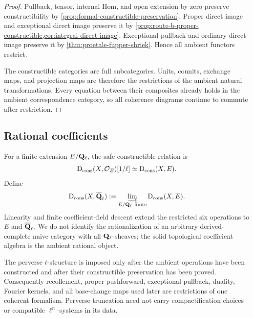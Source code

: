 \begin{proof}
Pullback, tensor, internal Hom, and open extension by zero preserve
constructibility by
\cref{prop:formal-constructible-preservation}.  Proper direct image and
exceptional direct image preserve it by
\cref{prop:route-b-proper-constructible,cor:integral-direct-image}.
Exceptional pullback and ordinary direct image preserve it by
\cref{thm:proetale-fupper-shriek}.  Hence all ambient functors restrict.

The constructible categories are full subcategories.  Units, counits,
exchange maps, and projection maps are therefore the restrictions of the
ambient natural transformations.  Every equation between their composites
already holds in the ambient correspondence category, so all coherence
diagrams continue to commute after restriction.
\end{proof}

\subsection{Rational coefficients}

For a finite extension \(E/\mathbf Q_\ell\), the safe constructible relation is
\[
 \mathrm D_{\mathrm{cons}}(X,\mathcal O_E)[1/\ell]
   \simeq\mathrm D_{\mathrm{cons}}(X,E).
\]
Define
\[
 \mathrm D_{\mathrm{cons}}(X,\overline{\mathbf Q}_\ell)
   :=\varinjlim_{E/\mathbf Q_\ell\ \mathrm{finite}}\mathrm D_{\mathrm{cons}}(X,E).
\]
Linearity and finite coefficient-field descent extend the restricted six
operations to \(E\) and \(\overline{\mathbf Q}_\ell\).  We do not identify the rationalization
of an arbitrary derived-complete naive category with all
\(\mathbf Q_\ell\)-sheaves; the solid topological coefficient algebra is the ambient
rational object.

\begin{powerbox}[title={Why this architecture helps the perverse proof}]
The perverse \(t\)-structure is imposed only after the ambient operations
have been constructed and after their constructible preservation has been
proved.  Consequently recollement, proper pushforward, exceptional
pullback, duality, Fourier kernels, and all base-change maps used later are
restrictions of one coherent formalism.  Perverse truncation need not carry
compactification choices or compatible \(\ell^n\)-systems in its data.
\end{powerbox}

